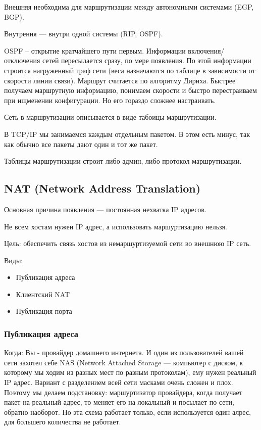 \documentclass[10pt,a4paper,oneside,titlepage]{report}
\theoremstyle{defenition}
\begin{document}
Внешняя необходима для маршрутизации между автономными системами (EGP, BGP).

Внутрення --- внутри одной системы (RIP, OSPF).

OSPF -- открытие кратчайшего пути первым. Информации включения/отключения сетей пересылается сразу, по мере появления. По этой информации строится нагруженный граф сети (веса назначаются по таблице в зависимости от скорости линии связи). Маршрут считается по алгоритму Дириха. Быстрее получаем маршрутную информацию, понимаем скорости и быстро перестраиваем при ищменении конфигурации. Но его гораздо сложнее настраивать. 

Сеть в маршрутизации описывается в виде табоицы маршрутизации. 

В TCP/IP мы занимаемся каждым отдельным пакетом. В этом есть минус, так как обычно все пакеты дают один и тот же пакет.

Таблицы маршрутизации строит либо админ, либо протокол маршрутизации. 

\subsection{NAT (Network Address Translation)}

Основная причина появления --- постоянная нехватка IP адресов.

Не всем хостам нужен IP адрес, а использовать маршуртизацию нельзя.

Цель: обеспечить связь хостов из немаршуртизуемой сети во внешнюю IP сеть.

Виды:
\begin{itemize}
	\item Публикация адреса
	\item Клиентский NAT
	\item Публикация порта
\end{itemize}

\subsubsection{Публикация адреса}

Когда: Вы - провайдер домашнего интернета. И один из пользователей вашей сети захотел себе NAS (Network Attached Storage --- компьютер с диском, к которому мы ходим из разных мест по разным протоколам), ему нужен реальный IP адрес. Вариант с разделением всей сети масками очень сложен и плох. Поэтому мы делаем подстановку: маршуртизатор провайдера, когда получает пакет на реальный адрес, то меняет его на локальный и посылает по сети, обратно наоборот. Но эта схема работает только, если используется один алрес, для большего количества не работает.
\end{document}
